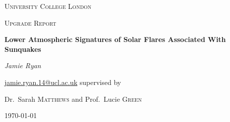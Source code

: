 \documentclass[12pt,a4paper]{report}
\begin{document}
\begin{titlepage}
	\centering
	{\scshape\LARGE University College London\par}
	\vspace{1cm}
	{\scshape\Large Upgrade Report\par}
	\vspace{1.5cm}
	{\huge\bfseries Lower Atmospheric Signatures of Solar Flares Associated With Sunquakes \par}
	\vspace{2cm}
	{\Large\itshape Jamie Ryan\par}
    \href{mailto:jamie.ryan.14@ucl.ac.uk}{jamie.ryan.14@ucl.ac.uk}
	\vfill
	supervised by\par
	Dr.~Sarah \textsc{Matthews} and Prof.~Lucie \textsc{Green}

	\vfill

	{\large \today\par}
\end{titlepage}
\end{document}
